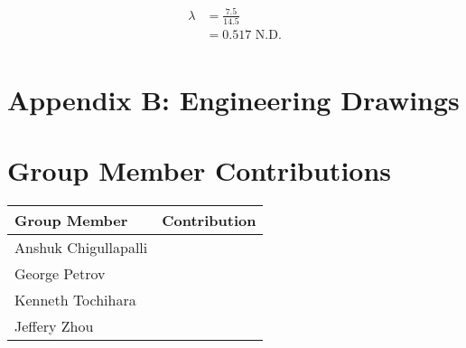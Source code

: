 \begin{enumerate}[wide,label=\textbf{\arabic*}., labelindent=0pt]
        \begin{align*}
            \lambda &= \frac{7.5}{14.5}\\
            &= 0.517 \text{ N.D.}\\
        \end{align*}    
 
\section*{Appendix B: Engineering Drawings}\label{ApxB}   


\section*{Group Member Contributions}

    \begin{table}[H]
        \begin{center}
        \begin{tabular}{ | p{2in} | p{4in}| } 
            \hline
            \textbf{Group Member} & \textbf{Contribution} \\  \hline
            Anshuk Chigullapalli & \\ \hline
            George Petrov &  \\ \hline
            Kenneth Tochihara & \\ \hline
            Jeffery Zhou & \\ \hline
        \end{tabular}
        \end{center}
    \end{table}
\end{enumerate}